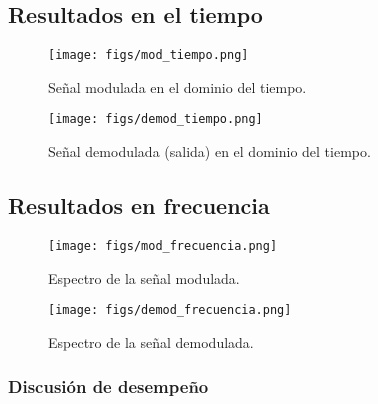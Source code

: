 \documentclass[letter,12pt]{article}
\begin{document}
\subsection{Resultados en el tiempo}
\begin{figure}[H]
  \centering
  \texttt{[image: figs/mod\_tiempo.png]} %
  \caption{Señal modulada en el dominio del tiempo.}
  \label{fig:mod-tiempo}
\end{figure}
\begin{figure}[H]
  \centering
  \texttt{[image: figs/demod\_tiempo.png]} %
  \caption{Señal demodulada (salida) en el dominio del tiempo.}
  \label{fig:demod-tiempo}
\end{figure}
\subsection{Resultados en frecuencia}
\begin{figure}[H]
  \centering
  \texttt{[image: figs/mod\_frecuencia.png]} %
  \caption{Espectro de la señal modulada.}
  \label{fig:mod-freq}
\end{figure}
\begin{figure}[H]
  \centering
  \texttt{[image: figs/demod\_frecuencia.png]} %
  \caption{Espectro de la señal demodulada.}
  \label{fig:demod-freq}
\end{figure}
\subsubsection{Discusión de desempeño}


    
\newpage
\printbibliography
\end{document}
